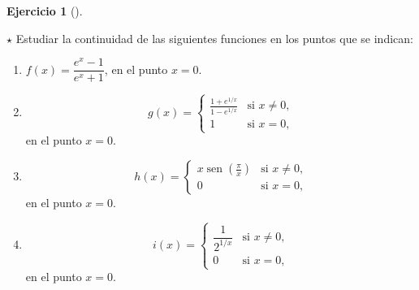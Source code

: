 \documentclass[
  a4paper,
]{scrreport}
\theoremstyle{definition}
\newtheorem{exercise}{Ejercicio}[chapter]
\theoremstyle{remark}
\begin{document}
\begin{exercise}[]\protect\hypertarget{exr-clasificacion-dicontinuidades}{}\label{exr-clasificacion-dicontinuidades}

\(\star\) Estudiar la continuidad de las siguientes funciones en los
puntos que se indican:

\begin{enumerate}
\def\labelenumi{\alph{enumi}.}
\item
  \(f(x)=\dfrac{e^x-1}{e^x+1}\), en el punto \(x=0\).
\item
  \[
  g(x)=
  \begin{cases}
  \frac{1+e^{1/x}}{1-e^{1/x}} & \mbox{si $x\neq 0$,} \\
  1 &  \mbox{si $x=0$,}
  \end{cases}
  \] en el punto \(x=0\).
\item
  \[
  h(x)=
  \begin{cases}
  x\operatorname{sen}\left(\frac{\pi}{x}\right) & \mbox{si $x\neq 0$,} \\
  0 & \mbox{si $x=0$,}
  \end{cases}
  \] en el punto \(x=0\).
\item
  \[
  i(x)=
  \begin{cases}
  \dfrac{1}{2^{1/x}} &  \mbox{si $x\neq 0$,} \\
  0 & \mbox{si $x=0$,}
  \end{cases}
  \] en el punto \(x=0\).
\end{enumerate}

\end{exercise}
\end{document}
